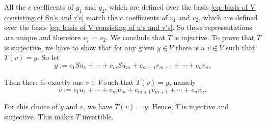 \begin{xrcs}
\begin{xprf}
    All the $c$ coefficents of $y_1$ and $y_2$, which are defined over the basis \eqref{eq: basis of V consisting of Su's and r's} match the $c$ coefficients of $v_1$ and $v_2$, which are defined over the basis \eqref{eq: basis of V consisting of u's and v's}. So these representations are unique and therefore $v_1$ = $v_2$. We conclude that $T$ is injective. To prove that $T$ is surjective, we have to show that for any given $y \in V$ there is a $v \in V$ such that $T(v) = y$. So let
    \begin{equation}
      y := c_1 S u_1 + \cdots + c_m S u_m + c_{m+1} r_{m+1} + \cdots + c_n r_n.
    \end{equation}

    Then there is exactly one $v \in V$  such that $T(v) = y$, namely
    \begin{equation}
      v := c_1 u_1 + \cdots + c_m u_m + c_{m+1} v_{m+1} + \cdots + c_n v_n.
    \end{equation}

    For this choice of $y$ and $v$, we have $T(v) = y$. Hence, $T$ is injective and surjective. This makes $T$ invertible.
  \end{xprf}
\end{xrcs}
